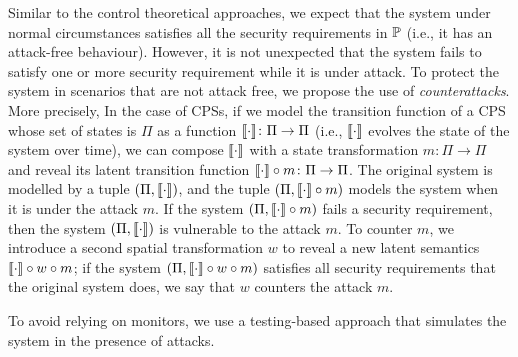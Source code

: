 {Similar to the control theoretical approaches, we expect that the system under normal circumstances satisfies all the security requirements in $\mathbb{P}$ (i.e., it has an attack-free behaviour). However, it is not unexpected that the system fails to satisfy one or more security requirement while it is under attack. To protect the system in scenarios that are not attack free, we propose the use of \emph{counterattacks}. 
More precisely, In the case of CPSs, if we model the transition function of a CPS whose set of states is $\Pi$ as a function ${{{\llbracket\cdot\rrbracket}}}\colon\Pi\rightarrow\Pi$ (i.e., ${{{\llbracket\cdot\rrbracket}}}$ evolves the state of the system over time), we can compose ${{{\llbracket\cdot\rrbracket}}}$ with a state transformation $m\colon \Pi\rightarrow\Pi$ and reveal its latent transition function ${{{\llbracket\cdot\rrbracket}}}\circ m\colon\Pi\rightarrow\Pi$. The original system is modelled by a tuple $(\Pi,{{{\llbracket\cdot\rrbracket}}})$, and the tuple $(\Pi,{{{\llbracket\cdot\rrbracket}}}\circ m)$ models the system when it is under the attack $m$. If the system $(\Pi,{{{\llbracket\cdot\rrbracket}}}\circ m)$ fails a security requirement, then the system $(\Pi,{{{\llbracket\cdot\rrbracket}}})$ is vulnerable to the attack $m$. To counter $m$, we introduce a second spatial transformation $w$ to reveal a new latent semantics ${{{\llbracket\cdot\rrbracket}}}\circ w\circ m$; if the system $(\Pi,{{{\llbracket\cdot\rrbracket}}}\circ w\circ m)$ satisfies all security requirements that the original system does, we say that $w$ counters the attack $m$.


To avoid relying on monitors, we use a testing-based approach that simulates the system in the presence of attacks. %
}


